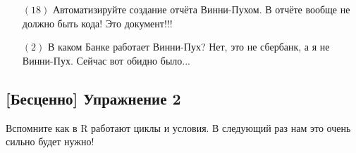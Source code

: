 \documentclass[12pt, a4paper, oneside]{article}
\begin{document}

\begin{itemize}
	\item[$(18)$] Автоматизируйте создание отчёта Винни-Пухом. В отчёте вообще не должно быть кода! Это документ!!!
	\item[$(2)$]  В каком Банке работает Винни-Пух? Нет, это не сбербанк, а я не Винни-Пух. Сейчас вот обидно было...
\end{itemize}


\subsection*{[Бесценно]  Упражнение 2  }

Вспомните как в R работают циклы и условия. В следующий раз нам это очень сильно будет нужно!
\end{document}
